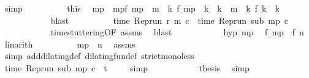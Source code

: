 \begin{isabellebody}
\ simp\isanewline
\ \ \ \ \ \ \ \ \isamarkupfalse%
\ this\ \isamarkupfalse%
\ m\isactrlsub p\ \ mp{\isacharcolon}{\isacartoucheopen}f\ m\isactrlsub p\ {\isacharless}\ m\ {\isasymand}\ {\isacharparenleft}{\isasymforall}k{\isachardot}\ f\ m\isactrlsub p\ {\isacharless}\ k\ {\isasymand}\ k\ {\isasymle}\ m\ {\isasymlongrightarrow}\ {\isacharparenleft}{\isasymnexists}k\ f\ k\ {\isacharequal}\ k{\isacharparenright}{\isacharparenright}{\isacartoucheclose}\isanewline
\ \ \ \ \ \ \ \ \ \ \isamarkupfalse%
\ blast\isanewline
\ \ \ \ \ \ \ \ \isamarkupfalse%
\ {\isacartoucheopen}time\ {\isacharparenleft}{\isacharparenleft}Rep{\isacharunderscore}run\ r{\isacharparenright}\ m\ c{\isacharparenright}\ {\isacharequal}\ time\ {\isacharparenleft}{\isacharparenleft}Rep{\isacharunderscore}run\ sub{\isacharparenright}\ m\isactrlsub p\ c{\isacharparenright}{\isacartoucheclose}\isanewline
\ \ \ \ \ \ \ \ \ \ \isamarkupfalse%
\ time{\isacharunderscore}stuttering{\isacharbrackleft}OF\ assms{\isacharbrackright}\ \isamarkupfalse%
\ blast\isanewline
\ \ \ \ \ \ \ \ \isamarkupfalse%
\ \isamarkupfalse%
\ hyp\ mp\ \isamarkupfalse%
\ {\isacartoucheopen}f\ m\isactrlsub p\ {\isacharless}\ f\ n{\isacartoucheclose}\ \isamarkupfalse%
\ linarith\isanewline
\ \ \ \ \ \ \ \ \isamarkupfalse%
\ {\isacartoucheopen}m\isactrlsub p\ {\isacharless}\ n{\isacartoucheclose}\ \isamarkupfalse%
\ assms\isanewline
\ \ \ \ \ \ \ \ \ \ \isamarkupfalse%
\ {\isacharparenleft}simp\ add{\isacharcolon}dilating{\isacharunderscore}def\ dilating{\isacharunderscore}fun{\isacharunderscore}def\ strict{\isacharunderscore}mono{\isacharunderscore}less{\isacharparenright}\isanewline
\ \ \ \ \ \ \ \ \isamarkupfalse%
\ {\isacartoucheopen}time\ {\isacharparenleft}{\isacharparenleft}Rep{\isacharunderscore}run\ sub{\isacharparenright}\ m\isactrlsub p\ c{\isacharparenright}\ {\isacharless}\ t{\isacartoucheclose}\ \isamarkupfalse%
\ {\isacharasterisk}\ \isamarkupfalse%
\ simp\isanewline
\ \ \ \ \ \ \ \ \isamarkupfalse%
\ \isamarkupfalse%
\ {\isacharquery}thesis\ \isamarkupfalse%
\ simp\isanewline
\ \ \ \ \ \ \isamarkupfalse%
\isanewline
\ \ \ \ \isacommand{{\isacharbraceright}}\isamarkupfalse%
\ \isamarkupfalse%

\end{isabellebody}
